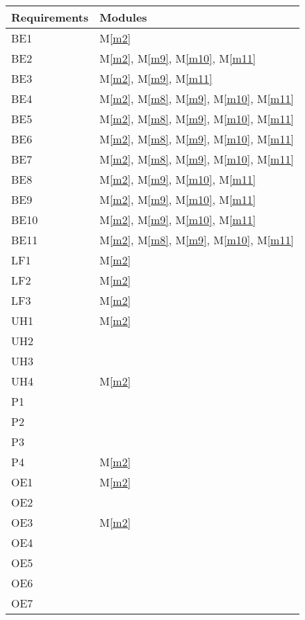 \documentclass[12pt, titlepage]{article}
\newcommand{\mref}[1]{M\ref{#1}}
\begin{document}
\begin{table}[H]
    \centering
    \begin{tabular}{p{} p{}}
        \toprule
        \textbf{Requirements} & \textbf{Modules}\\
        \midrule
        BE1 & \mref{m2}\\
        BE2 & \mref{m2}, \mref{m9}, \mref{m10}, \mref{m11}\\
        BE3 & \mref{m2}, \mref{m9}, \mref{m11}\\
        BE4 & \mref{m2}, \mref{m8}, \mref{m9}, \mref{m10}, \mref{m11}\\
        BE5 & \mref{m2}, \mref{m8}, \mref{m9}, \mref{m10}, \mref{m11}\\
        BE6 & \mref{m2}, \mref{m8}, \mref{m9}, \mref{m10}, \mref{m11}\\
        BE7 & \mref{m2}, \mref{m8}, \mref{m9}, \mref{m10}, \mref{m11}\\
        BE8 & \mref{m2}, \mref{m9}, \mref{m10}, \mref{m11}\\
        BE9 & \mref{m2}, \mref{m9}, \mref{m10}, \mref{m11}\\
        BE10 & \mref{m2}, \mref{m9}, \mref{m10}, \mref{m11}\\
        BE11 & \mref{m2}, \mref{m8}, \mref{m9}, \mref{m10}, \mref{m11}\\
        LF1 & \mref{m2}\\
        LF2 & \mref{m2}\\
        LF3 & \mref{m2}\\
        UH1 & \mref{m2}\\
        UH2 & ~\\
        UH3 & ~\\
        UH4 & \mref{m2}\\
        P1 & ~\\
        P2 & ~\\
        P3 & ~\\
        P4 & \mref{m2}\\
        OE1 & \mref{m2}\\
        OE2 & ~\\
        OE3 & \mref{m2}\\
        OE4 & ~\\
        OE5 & ~\\
        OE6 & ~\\
        OE7 & ~\\

\end{tabular}
\end{table}
\end{document}
